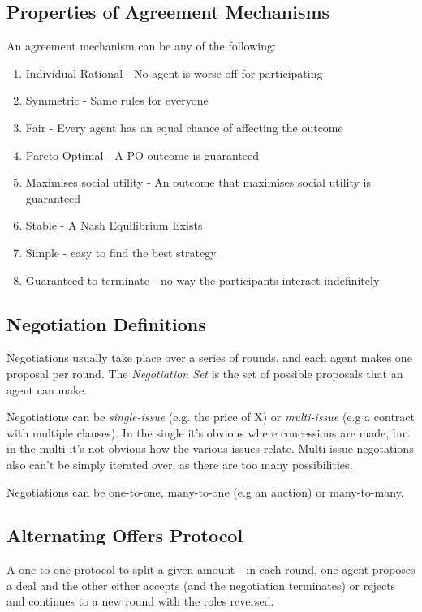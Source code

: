 \subsection{Properties of Agreement Mechanisms}
An agreement mechanism can be any of the following:
\begin{enumerate}
    \item Individual Rational - No agent is worse off for participating
    \item Symmetric - Same rules for everyone
    \item Fair - Every agent has an equal chance of affecting the outcome
    \item Pareto Optimal - A PO outcome is guaranteed
    \item Maximises social utility - An outcome that maximises social utility is guaranteed
    \item Stable - A Nash Equilibrium Exists
    \item Simple - easy to find the best strategy
    \item Guaranteed to terminate - no way the participants interact indefinitely 
\end{enumerate}

\subsection{Negotiation Definitions}
Negotiations usually take place over a series of rounds, and each agent makes one proposal per round. The \emph{Negotiation Set} is the set of possible proposals that an agent can make.

Negotiations can be \emph{single-issue} (e.g. the price of X) or \emph{multi-issue} (e.g a contract with multiple clauses). In the single it's obvious where concessions are made, but in the multi it's not obvious how the various issues relate. Multi-issue negotations also can't be simply iterated over, as there are too many possibilities. 

Negotiations can be one-to-one, many-to-one (e.g an auction) or many-to-many.

\subsection{Alternating Offers Protocol}
A one-to-one protocol to split a given amount - in each round, one agent proposes a deal and the other either accepts (and the negotiation terminates) or rejects and continues to a new round with the roles reversed.


